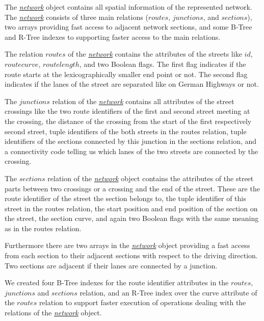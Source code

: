 \documentclass[a4paper]{article}
\newcommand{\dt}[1]{\textsl{\underline{#1}}}
\begin{document}
The \dt{network} object contains all spatial information of the represented network.
The \dt{network} consists of three main relations ($routes$, $junctions$, and $sections$),
two arrays providing fast access to adjacent network sections,
and some B-Tree and R-Tree indexes to supporting faster access to the main relations.

The relation $routes$ of the \dt{network} contains the attributes of the
streets like $id$, $route curve$, $route length$, and two Boolean flags. The first
flag indicates if the route starts at the lexicographically smaller end point or not.
The second flag indicates if the lanes of the street are separated like on German
Highways or not.

The $junctions$ relation of the \dt{network} contains all attributes of the street
crossings like the two route identifiers of the first and second street meeting at the
crossing, the distance of the crossing from the start of the first respectively
second street, tuple identifiers of the both streets in the routes relation,
tuple identifiers of the sections connected by this junction in the sections relation,
and a connectivity code telling us which lanes of the two streets are connected
by the crossing.

The $sections$ relation of the \dt{network} object contains the
attributes of the street parts between two crossings or a crossing and
the end of the street. These are the route identifier of the street the section
belongs to, the tuple identifier of this street in the routes relation, the start
position and end position of the section on the street, the section curve, and
again two Boolean flags with the same meaning as in the routes relation.

Furthermore there are two arrays in the \dt{network} object providing a fast
access from each section to their adjacent sections with respect to the driving
direction. Two sections are adjacent if their lanes are connected by a junction.

We created four B-Tree indexes for the route identifier attributes in the $routes$,
$junctions$ and $sections$ relation, and an R-Tree index over the curve attribute
of the $routes$ relation to support faster execution of operations dealing with
the relations of the \dt{network} object.
\end{document}
